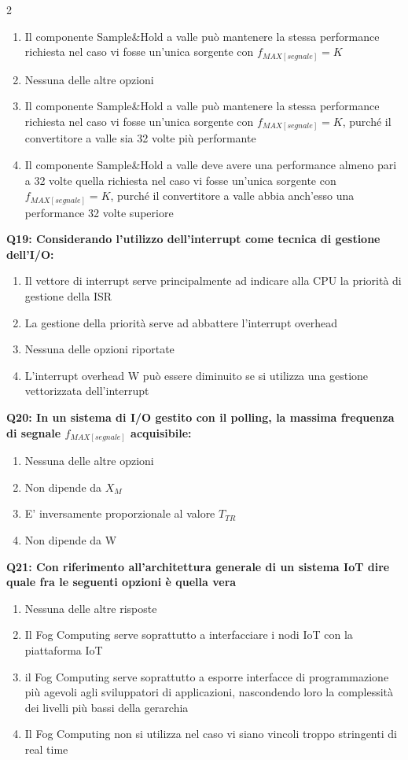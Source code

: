 \documentclass[10pt]{article}
\begin{document}
\begin{multicols}{2}
\begin{enumerate}[label=\arabic*.]
\item Il componente Sample\&Hold a valle può mantenere la stessa performance richiesta nel caso vi fosse un'unica sorgente con $f_{MAX[segnale]} = K$
\item Nessuna delle altre opzioni
\item Il componente Sample\&Hold a valle può mantenere la stessa performance richiesta nel caso vi fosse un'unica sorgente con $f_{MAX[segnale]} = K$, purché il convertitore a valle sia 32 volte più performante
\item Il componente Sample\&Hold a valle deve avere una performance almeno pari a 32 volte quella richiesta nel caso vi fosse un'unica sorgente con $f_{MAX[segnale]} = K$, purché il convertitore a valle abbia anch’esso una performance 32 volte superiore
\end{enumerate}
\textbf{Q19: Considerando l’utilizzo dell’interrupt come tecnica di gestione dell’I/O:}

\begin{enumerate}[label=\arabic*.]
\item Il vettore di interrupt serve principalmente ad indicare alla CPU la priorità di gestione della ISR
\item La gestione della priorità serve ad abbattere l’interrupt overhead
\item Nessuna delle opzioni riportate
\item L’interrupt overhead W può essere diminuito se si utilizza una gestione vettorizzata dell’interrupt
\end{enumerate}
\textbf{Q20: In un sistema di I/O gestito con il polling, la massima frequenza di segnale $f_{MAX[segnale]}$ acquisibile:}

\begin{enumerate}[label=\arabic*.]
\item Nessuna delle altre opzioni
\item Non dipende da $X_M$
\item E' inversamente proporzionale al valore $T_{TR}$
\item Non dipende da W
\end{enumerate}
\textbf{Q21: Con riferimento all’architettura generale di un sistema IoT dire quale fra le seguenti opzioni è quella vera}

\begin{enumerate}[label=\arabic*.]
\item Nessuna delle altre risposte
\item Il Fog Computing serve soprattutto a interfacciare i nodi IoT con la piattaforma IoT
\item il Fog Computing serve soprattutto a esporre interfacce di programmazione più agevoli agli sviluppatori di applicazioni, nascondendo loro la complessità dei livelli più bassi della gerarchia
\item Il Fog Computing non si utilizza nel caso vi siano vincoli troppo stringenti di real time
\end{enumerate}
\end{multicols}
\end{document}
